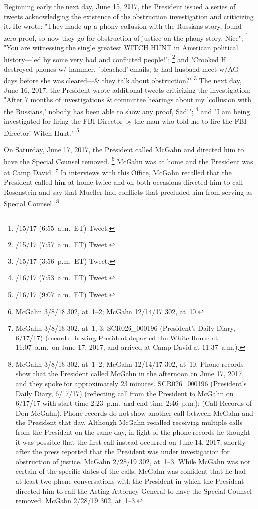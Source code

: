 {Beginning early the next day, June 15, 2017, the President issued a series of tweets acknowledging the existence of the obstruction investigation and criticizing it.
He wrote: "They made up a phony collusion with the Russians story, found zero proof, so now they go for obstruction of justice on the phony story.
Nice";%
\footnote{/15/17 (6:55~a.m.~ET) Tweet.}
"You are witnessing the single greatest WITCH HUNT in American political history---led by some very bad and conflicted people!";%
\footnote{/15/17 (7:57~a.m.~ET) Tweet.}
and "Crooked H destroyed phones w/ hammer, 'bleached' emails, \& had husband meet w/AG days before she was cleared---\& they talk about obstruction?"%
\footnote{/15/17 (3:56~p.m.~ET) Tweet.}
The next day, June 16, 2017, the President wrote additional tweets criticizing the investigation:
"After 7 months of investigations \& committee hearings about my 'collusion with the Russians,' nobody has been able to show any proof, Sad!";%
\footnote{/16/17 (7:53~a.m.~ET) Tweet.}
and "I am being investigated for firing the FBI Director by the man who told me to fire the FBI Director!
Witch Hunt."%
\footnote{/16/17 (9:07~a.m.~ET) Tweet.}

On Saturday, June 17, 2017, the President called McGahn and directed him to have the Special Counsel removed.%
\footnote{McGahn 3/8/18 302, at~1--2;
McGahn 12/14/17 302, at~10.}
McGahn was at home and the President was at Camp David.%
\footnote{McGahn 3/8/18 302, at~1, 3;
SCR026\_000196 (President's Daily Diary, 6/17/17) (records showing President departed the White House at 11:07~a.m.\ on June 17, 2017, and arrived at Camp David at 11:37~a.m.).}
In interviews with this Office, McGahn recalled that the President called him at home twice and on both occasions directed him to call Rosenstein and say that Mueller had conflicts that precluded him from serving as Special Counsel.%
\footnote{McGahn 3/8/18 302, at~1--2;
McGahn 12/14/17 302, at~10.
Phone records show that the President called McGahn in the afternoon on June 17, 2017, and they spoke for approximately 23 minutes.
SCR026\_000196 (President's Daily Diary, 6/17/17) (reflecting call from the President to McGahn on 6/17/17 with start time 2:23~p.m.\ and end time 2:46~p.m.);
(Call Records of Don McGahn).
Phone records do not show another call between McGahn and the President that day.
Although McGahn recalled receiving multiple calls from the President on the same day, in light of the phone records he thought it was possible that the first call instead occurred on June 14, 2017, shortly after the press reported that the President was under investigation for obstruction of justice.
McGahn 2/28/19 302, at~1--3.
While McGahn was not certain of the specific dates of the calls, McGahn was confident that he had at least two phone conversations with the President in which the President directed him to call the Acting Attorney General to have the Special Counsel removed.
McGahn 2/28/19 302, at~1--3.}

}
